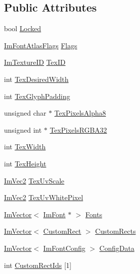 \subsection*{Public Attributes}
\begin{DoxyCompactItemize}
\item 
bool \mbox{\hyperlink{struct_im_font_atlas_a2222ff64ba974a8ee7a286617f879f9b}{Locked}}
\item 
\mbox{\hyperlink{imgui_8h_a6ac370f8e39385273ab2d0fcc644db6f}{Im\+Font\+Atlas\+Flags}} \mbox{\hyperlink{struct_im_font_atlas_adf2f2d04b46911ad01cfbef0f59e1f11}{Flags}}
\item 
\mbox{\hyperlink{imgui_8h_a364f4447ecbc4ca176145ccff9db6286}{Im\+Texture\+ID}} \mbox{\hyperlink{struct_im_font_atlas_a1d7be9a6190c75706f80bda16c87f28e}{Tex\+ID}}
\item 
int \mbox{\hyperlink{struct_im_font_atlas_aa1d62d7da5633f894dbe881547e9de7c}{Tex\+Desired\+Width}}
\item 
int \mbox{\hyperlink{struct_im_font_atlas_a32034b2aac4616d8c27ee666a1fd1b62}{Tex\+Glyph\+Padding}}
\item 
unsigned char $\ast$ \mbox{\hyperlink{struct_im_font_atlas_a443ea9e7c4cf85ee791ffe891280eff3}{Tex\+Pixels\+Alpha8}}
\item 
unsigned int $\ast$ \mbox{\hyperlink{struct_im_font_atlas_a41163489a5b8060f405c56e22590cba5}{Tex\+Pixels\+R\+G\+B\+A32}}
\item 
int \mbox{\hyperlink{struct_im_font_atlas_a2d0662502433e7a87b3aa4681ba17aa3}{Tex\+Width}}
\item 
int \mbox{\hyperlink{struct_im_font_atlas_a5ef74d37ec01d9e8aac5c57433296ce3}{Tex\+Height}}
\item 
\mbox{\hyperlink{struct_im_vec2}{Im\+Vec2}} \mbox{\hyperlink{struct_im_font_atlas_adbe3a6b1fd501108649fe04f882b8664}{Tex\+Uv\+Scale}}
\item 
\mbox{\hyperlink{struct_im_vec2}{Im\+Vec2}} \mbox{\hyperlink{struct_im_font_atlas_af1d05221e9a1607d7f625df92a4f9b7e}{Tex\+Uv\+White\+Pixel}}
\item 
\mbox{\hyperlink{class_im_vector}{Im\+Vector}}$<$ \mbox{\hyperlink{struct_im_font}{Im\+Font}} $\ast$ $>$ \mbox{\hyperlink{struct_im_font_atlas_a0198aeb17ef8bb810ccc8db103b93b1f}{Fonts}}
\item 
\mbox{\hyperlink{class_im_vector}{Im\+Vector}}$<$ \mbox{\hyperlink{struct_im_font_atlas_1_1_custom_rect}{Custom\+Rect}} $>$ \mbox{\hyperlink{struct_im_font_atlas_a6289931d958f734fdc2ac1fadec99577}{Custom\+Rects}}
\item 
\mbox{\hyperlink{class_im_vector}{Im\+Vector}}$<$ \mbox{\hyperlink{struct_im_font_config}{Im\+Font\+Config}} $>$ \mbox{\hyperlink{struct_im_font_atlas_afa4f7459807763d032fe2d0022fc0823}{Config\+Data}}
\item 
int \mbox{\hyperlink{struct_im_font_atlas_a608ad12c2ccf1eed97b63454e52ccbe8}{Custom\+Rect\+Ids}} \mbox{[}1\mbox{]}
\end{DoxyCompactItemize}



